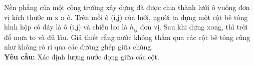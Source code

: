 Nền phẳng của một công trường xây dựng đã được chia thành lưới ô vuông đơn vị kích thước m x n ô. Trên mỗi ô (i,j) của lưới, người ta dựng một cột bê tông hình hộp có đáy là ô (i,j) và chiều lao là $h_{ij}$ đơn vị. Sau khi dựng xong, thì trời đổ mưa to và đủ lâu. Giả thiết rằng nước không thấm qua các cột bê tông cũng như không rò rỉ qua các đường ghép giữa chúng.
\\\textbf{Yêu cầu:} Xác định lượng nước đọng giữa các cột.